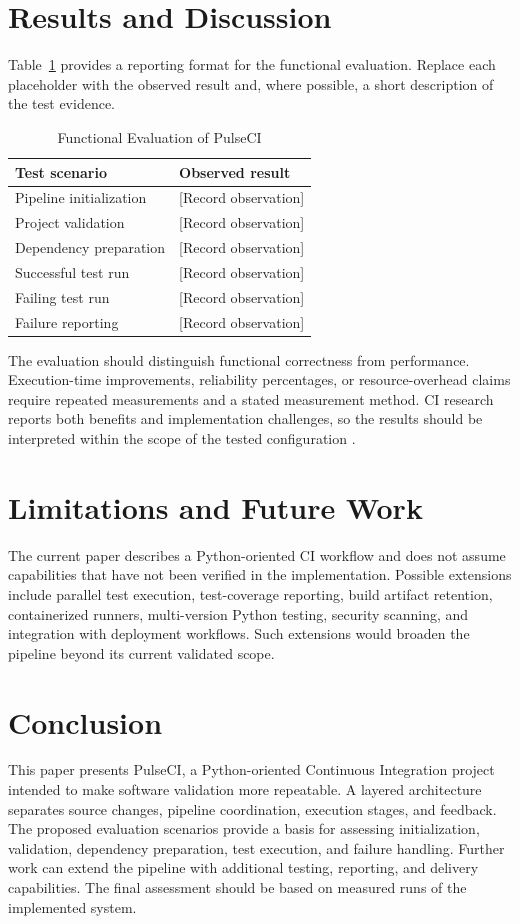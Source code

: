 \documentclass[conference]{IEEEtran}
\begin{document}
\section{Results and Discussion}
Table~\ref{tab:results} provides a reporting format for the functional evaluation. Replace each placeholder with the observed result and, where possible, a short description of the test evidence.

\begin{table}[htbp]
\centering
\caption{Functional Evaluation of PulseCI}
\label{tab:results}
\begin{tabular}{p{} p{}}
\toprule
\textbf{Test scenario} & \textbf{Observed result}\\
\midrule
Pipeline initialization & [Record observation]\\
Project validation & [Record observation]\\
Dependency preparation & [Record observation]\\
Successful test run & [Record observation]\\
Failing test run & [Record observation]\\
Failure reporting & [Record observation]\\
\bottomrule
\end{tabular}
\end{table}

The evaluation should distinguish functional correctness from performance. Execution-time improvements, reliability percentages, or resource-overhead claims require repeated measurements and a stated measurement method. CI research reports both benefits and implementation challenges, so the results should be interpreted within the scope of the tested configuration \cite{soares,ci_ieee}.

\section{Limitations and Future Work}
The current paper describes a Python-oriented CI workflow and does not assume capabilities that have not been verified in the implementation. Possible extensions include parallel test execution, test-coverage reporting, build artifact retention, containerized runners, multi-version Python testing, security scanning, and integration with deployment workflows. Such extensions would broaden the pipeline beyond its current validated scope.

\section{Conclusion}
This paper presents PulseCI, a Python-oriented Continuous Integration project intended to make software validation more repeatable. A layered architecture separates source changes, pipeline coordination, execution stages, and feedback. The proposed evaluation scenarios provide a basis for assessing initialization, validation, dependency preparation, test execution, and failure handling. Further work can extend the pipeline with additional testing, reporting, and delivery capabilities. The final assessment should be based on measured runs of the implemented system.
\end{document}
